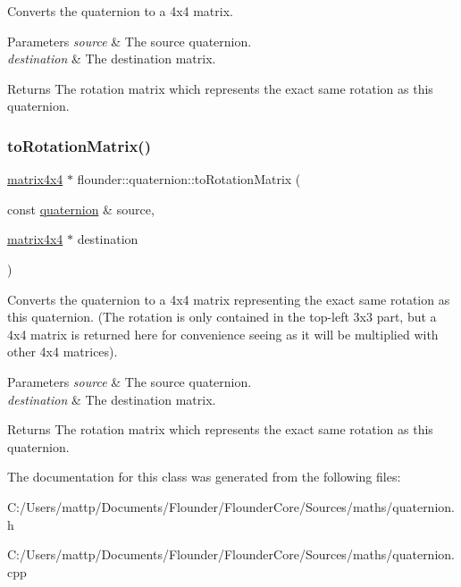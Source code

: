 Converts the quaternion to a 4x4 matrix. 


\begin{DoxyParams}{Parameters}
{\em source} & The source quaternion. \\
\hline
{\em destination} & The destination matrix.\\
\hline
\end{DoxyParams}
\begin{DoxyReturn}{Returns}
The rotation matrix which represents the exact same rotation as this quaternion. 
\end{DoxyReturn}
\mbox{\label{classflounder_1_1quaternion_a27a4276b67f349b8cd79905bbd0c7ae4}} 
\subsubsection{\texorpdfstring{to\+Rotation\+Matrix()}{toRotationMatrix()}}
{\footnotesize\ttfamily \hyperlink{classflounder_1_1matrix4x4}{matrix4x4} $\ast$ flounder\+::quaternion\+::to\+Rotation\+Matrix (\begin{DoxyParamCaption}\item[{const \hyperlink{classflounder_1_1quaternion}{quaternion} \&}]{source,  }\item[{\hyperlink{classflounder_1_1matrix4x4}{matrix4x4} $\ast$}]{destination }\end{DoxyParamCaption})\hspace{0.3cm}{\ttfamily [static]}}



Converts the quaternion to a 4x4 matrix representing the exact same rotation as this quaternion. (The rotation is only contained in the top-\/left 3x3 part, but a 4x4 matrix is returned here for convenience seeing as it will be multiplied with other 4x4 matrices). 


\begin{DoxyParams}{Parameters}
{\em source} & The source quaternion. \\
\hline
{\em destination} & The destination matrix.\\
\hline
\end{DoxyParams}
\begin{DoxyReturn}{Returns}
The rotation matrix which represents the exact same rotation as this quaternion. 
\end{DoxyReturn}


The documentation for this class was generated from the following files\+:\begin{DoxyCompactItemize}
\item 
C\+:/\+Users/mattp/\+Documents/\+Flounder/\+Flounder\+Core/\+Sources/maths/quaternion.\+h\item 
C\+:/\+Users/mattp/\+Documents/\+Flounder/\+Flounder\+Core/\+Sources/maths/quaternion.\+cpp\end{DoxyCompactItemize}
